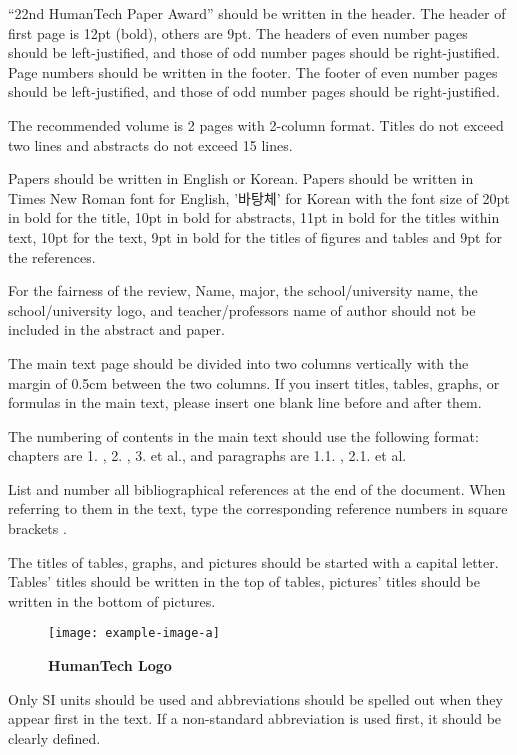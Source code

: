 \documentclass{abstract_hutech}
\begin{document}
``22nd HumanTech Paper Award'' should be written in the header. The header of first page is 12pt (bold), others are 9pt. The headers of even number pages should be left-justified, and those of odd number pages should be right-justified. Page numbers should be written in the footer. The footer of even number pages should be left-justified, and those of odd number pages should be right-justified.

The recommended volume is 2 pages with 2-column format. Titles do not exceed two lines and abstracts do not exceed 15 lines.

Papers should be written in English or Korean. Papers should be written in Times New Roman font for English, '바탕체' for Korean with the font size of 20pt in bold for the title, 10pt in bold for abstracts, 11pt in bold for the titles within text, 10pt for the text, 9pt in bold for the titles of figures and tables and 9pt for the references.

For the fairness of the review, Name, major, the school/university name, the school/university logo, and teacher/professors name of author should not be included in the abstract and paper.

The main text page should be divided into two columns vertically with the margin of 0.5cm between the two columns. If you insert titles, tables, graphs, or formulas in the main text, please insert one blank line before and after them.

The numbering of contents in the main text should use the following format: chapters are 1. , 2. , 3. et al., and paragraphs are 1.1. , 2.1. et al.

List and number all bibliographical references at the end of the document. When referring to them in the text, type the corresponding reference numbers in square brackets \cite{True00}.

The titles of tables, graphs, and pictures should be started with a capital letter. Tables’ titles should be written in the top of tables, pictures’ titles should be written in the bottom of pictures.

\begin{figure}[t]
\begin{center}
\texttt{[image: example-image-a]}
\end{center}
\caption{\bf HumanTech Logo}\label{Fig01}
\end{figure}

Only SI units should be used and abbreviations should be spelled out when they appear first in the text. If a non-standard abbreviation is used first, it should be clearly defined.
\end{document}

